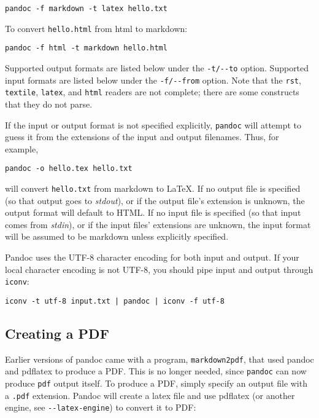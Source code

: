 \documentclass[]{article}
\begin{document}
\begin{verbatim}
pandoc -f markdown -t latex hello.txt
\end{verbatim}

To convert \texttt{hello.html} from html to markdown:

\begin{verbatim}
pandoc -f html -t markdown hello.html
\end{verbatim}

Supported output formats are listed below under the \texttt{-t/-{}-to}
option. Supported input formats are listed below under the
\texttt{-f/-{}-from} option. Note that the \texttt{rst},
\texttt{textile}, \texttt{latex}, and \texttt{html} readers are not
complete; there are some constructs that they do not parse.

If the input or output format is not specified explicitly,
\texttt{pandoc} will attempt to guess it from the extensions of the
input and output filenames. Thus, for example,

\begin{verbatim}
pandoc -o hello.tex hello.txt
\end{verbatim}

will convert \texttt{hello.txt} from markdown to LaTeX. If no output
file is specified (so that output goes to \emph{stdout}), or if the
output file's extension is unknown, the output format will default to
HTML. If no input file is specified (so that input comes from
\emph{stdin}), or if the input files' extensions are unknown, the input
format will be assumed to be markdown unless explicitly specified.

Pandoc uses the UTF-8 character encoding for both input and output. If
your local character encoding is not UTF-8, you should pipe input and
output through \texttt{iconv}:

\begin{verbatim}
iconv -t utf-8 input.txt | pandoc | iconv -f utf-8
\end{verbatim}

\subsection{Creating a PDF}

Earlier versions of pandoc came with a program, \texttt{markdown2pdf},
that used pandoc and pdflatex to produce a PDF. This is no longer
needed, since \texttt{pandoc} can now produce \texttt{pdf} output
itself. To produce a PDF, simply specify an output file with a
\texttt{.pdf} extension. Pandoc will create a latex file and use
pdflatex (or another engine, see \texttt{-{}-latex-engine}) to convert
it to PDF:
\end{document}
